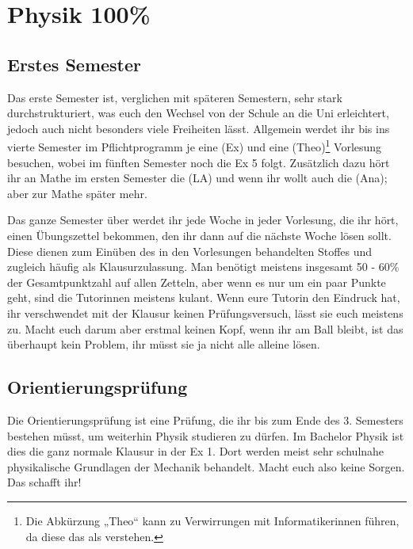 \vspace{-1mm}

\section{Physik 100\%}

\subsection{Erstes Semester}
Das erste Semester ist, verglichen mit späteren Semestern, sehr stark durchstrukturiert, was euch den Wechsel von der Schule an die Uni erleichtert, jedoch auch nicht besonders viele Freiheiten lässt.  Allgemein werdet ihr bis ins vierte Semester im Pflichtprogramm je eine  (\gls{Ex}) und eine  (\gls{Theo})\footnote{Die Abkürzung „Theo“ kann zu Verwirrungen mit Informatikerinnen führen, da diese das als  verstehen.} Vorlesung besuchen, wobei im fünften Semester noch die \gls{Ex} 5 folgt. Zusätzlich dazu hört ihr an Mathe im ersten Semester die  (\gls{LA}) und wenn ihr wollt auch die  (\gls{Ana}); aber zur Mathe später mehr.

Das ganze Semester über werdet ihr jede Woche in jeder Vorlesung, die ihr hört, einen Übungszettel bekommen, den ihr dann auf die nächste Woche lösen sollt. Diese dienen zum Einüben des in den Vorlesungen behandelten Stoffes und zugleich häufig als Klausurzulassung. Man benötigt meistens insgesamt 50 - 60\% der Gesamtpunktzahl auf allen Zetteln, aber wenn es nur um ein paar Punkte geht, sind die Tutorinnen meistens kulant. Wenn eure Tutorin den Eindruck hat, ihr verschwendet mit der Klausur keinen Prüfungsversuch, lässt sie euch meistens zu. Macht euch darum aber erstmal keinen Kopf, wenn ihr am Ball bleibt, ist das überhaupt kein Problem, ihr müsst sie ja nicht alle alleine lösen.

\subsection{Orientierungsprüfung}
Die Orientierungsprüfung ist eine Prüfung, die ihr bis zum Ende des 3. Semesters bestehen müsst, um weiterhin Physik studieren zu dürfen. Im Bachelor Physik ist dies die ganz normale Klausur in der \gls{Ex} 1. Dort werden meist sehr schulnahe physikalische Grundlagen der Mechanik behandelt. Macht euch also keine Sorgen. Das schafft ihr!

